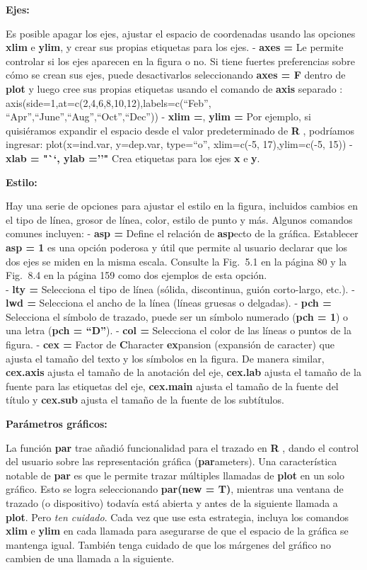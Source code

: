 \documentclass[
]{book}
\begin{document}
\textbf{Ejes:}

Es posible apagar los ejes, ajustar el espacio de coordenadas usando las opciones \textbf{xlim} e \textbf{ylim}, y crear sus propias etiquetas para los ejes.
- \textbf{axes =} Le permite controlar si los ejes aparecen en la figura o no. Si tiene fuertes preferencias sobre cómo se crean sus ejes, puede desactivarlos seleccionando \textbf{axes = F} dentro de \textbf{plot} y luego cree sus propias etiquetas usando el comando de \textbf{axis} separado : axis(side=1,at=c(2,4,6,8,10,12),labels=c(``Feb'', ``Apr'',``June'',``Aug'',``Oct'',``Dec''))
- \textbf{xlim =}, \textbf{ylim =} Por ejemplo, si quisiéramos expandir el espacio desde el valor predeterminado de \textbf{R} , podríamos ingresar: plot(x=ind.var, y=dep.var, type=``o'', xlim=c(-5, 17),ylim=c(-5, 15))
- \textbf{xlab = "``\textbf{, }ylab =''"} Crea etiquetas para los ejes \textbf{x} e \textbf{y}.

\textbf{Estilo:}

Hay una serie de opciones para ajustar el estilo en la figura, incluidos cambios en el tipo de línea, grosor de línea, color, estilo de punto y más. Algunos comandos comunes incluyen:
- \textbf{asp =} Define el relación de \textbf{asp}ecto de la gráfica. Establecer \textbf{asp = 1} es una opción poderosa y útil que permite al usuario declarar que los dos ejes se miden en la misma escala. Consulte la Fig.  5.1 en la página 80 y la Fig.  8.4 en la página 159 como dos ejemplos de esta opción.\\
- \textbf{lty =} Selecciona el tipo de línea (sólida, discontinua, guión corto-largo, etc.).
- \textbf{lwd =} Selecciona el ancho de la línea (líneas gruesas o delgadas).
- \textbf{pch =} Selecciona el símbolo de trazado, puede ser un símbolo numerado (\textbf{pch = 1}) o una letra (\textbf{pch = ``D''}).
- \textbf{col =} Selecciona el color de las líneas o puntos de la figura.
- \textbf{cex =} Factor de \textbf{C}haracter \textbf{ex}pansion (expansión de caracter) que ajusta el tamaño del texto y los símbolos en la figura. De manera similar, \textbf{cex.axis} ajusta el tamaño de la anotación del eje, \textbf{cex.lab} ajusta el tamaño de la fuente para las etiquetas del eje, \textbf{cex.main} ajusta el tamaño de la fuente del título y \textbf{cex.sub} ajusta el tamaño de la fuente de los subtítulos.

\textbf{Parámetros gráficos:}

La función \textbf{par} trae añadió funcionalidad para el trazado en \textbf{R} , dando el control del usuario sobre las representación gráfica (\textbf{par}ameters). Una característica notable de \textbf{par} es que le permite trazar múltiples llamadas de \textbf{plot} en un solo gráfico. Esto se logra seleccionando \textbf{par(new = T)}, mientras una ventana de trazado (o dispositivo) todavía está abierta y antes de la siguiente llamada a \textbf{plot}. Pero \emph{ten cuidado}. Cada vez que use esta estrategia, incluya los comandos \textbf{xlim} e \textbf{ylim} en cada llamada para asegurarse de que el espacio de la gráfica se mantenga igual. También tenga cuidado de que los márgenes del gráfico no cambien de una llamada a la siguiente.
\end{document}

